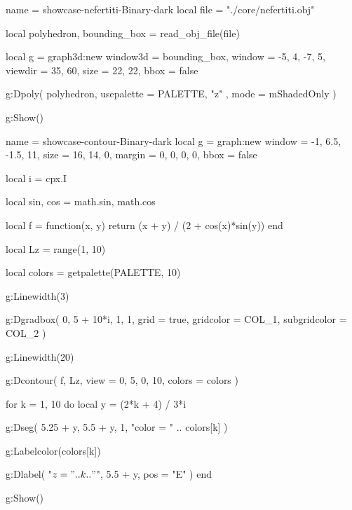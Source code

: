 \documentclass[theme = dark]{tutodoc}
\newcommand{\PALETTE}{Binary}
\begin{document}

\vfill

\begin{luadraw}{name = showcase-nefertiti-\PALETTE-dark}
local file = "./core/nefertiti.obj"

local polyhedron, bounding_box = read_obj_file(file)

local g = graph3d:new{
  window3d = bounding_box,
  window   = {-5, 4, -7, 5},
  viewdir  = {35, 60},
  size     = {22, 22},
  bbox     = false
}

g:Dpoly(
  polyhedron,
  {
    usepalette = {PALETTE, "z" },
    mode       = mShadedOnly
  }
)

g:Show()
\end{luadraw}



\newpage

\begin{luadraw}{name = showcase-contour-\PALETTE-dark}
local g = graph:new{
  window = {-1, 6.5, -1.5, 11},
  size   = {16, 14, 0},
  margin = {0, 0, 0, 0},
  bbox   = false
}

local i = cpx.I

local sin, cos = math.sin, math.cos

local f = function(x, y)
  return (x + y) / (2 + cos(x)*sin(y))
end

local Lz = range(1, 10)

local colors = getpalette(PALETTE, 10)

g:Linewidth(3)

g:Dgradbox(
  {0, 5 + 10*i, 1, 1},
  {
    grid         = true,
    gridcolor    = COL_1,
    subgridcolor = COL_2
  }
)

g:Linewidth(20)

g:Dcontour(
  f,
  Lz,
  {
    view   = {0, 5, 0, 10},
    colors = colors
  }
)

for k = 1, 10 do
  local y = (2*k + 4) / 3*i

  g:Dseg(
    {5.25 + y, 5.5 + y},
    1,
    "color = " .. colors[k]
  )

  g:Labelcolor(colors[k])

  g:Dlabel(
    "$z = " .. k .. "$",
    5.5 + y,
    {pos = "E"}
  )
end

g:Show()
\end{luadraw}


\end{document}
